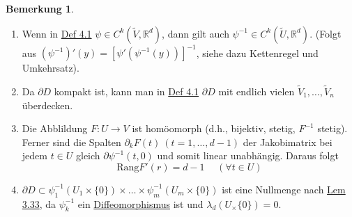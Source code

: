 \documentclass[a4paper]{scrreprt}
\newcommand{\R}{\mathbb{R}}
\newcommand{\jlabel}[1]{\label{j_#1}}
\newcommand{\jhyperref}[2]{\hyperref[j_#1]{#2}}
\newcommand{\jlink}[1]{\jhyperref{#1}{#1}}
\newcommand{\jabb}[3]{ #1: #2 \rightarrow #3 }
\theoremstyle{plain}
\theoremstyle{definition}
\newtheorem{bem}[thm]{Bemerkung}
\begin{document}
{{{{\jlabel{Bem 4.2}
\begin{bem}
    \begin{enumerate}
        \item Wenn in \jlink{Def 4.1} $\psi \in C^k(\tilde{V}, \R^d)$, dann gilt auch $\psi^{-1} \in C^k(\tilde{U}, \R^d)$. (Folgt aus $(\psi^{-1})'(y) = [\psi'(\psi^{-1}(y))]^{-1}$, siehe dazu Kettenregel und Umkehrsatz).
        \item Da $\partial D$ kompakt ist, kann man in \jlink{Def 4.1} $\partial D$ mit endlich vielen $\tilde{V}_1,\dots,\tilde{V}_n$ überdecken.
        \item Die Abblildung $\jabb{F}{U}{V}$ ist homöomorph (d.h., bijektiv, stetig, $F^{-1}$ stetig). Ferner sind die Spalten $\partial_kF(t) \ (t=1,\dots,d-1)$ der Jakobimatrix bei jedem $t\in U$ gleich $\partial \psi^{-1}(t,0)$ und somit linear unabhängig. Daraus folgt
        \begin{equation}
            \jlabel{(4.1)}
            \mathrm{Rang } F'(r) = d-1 \hspace{15pt} (\forall t\in U)
        \end{equation}
        \item $\partial D \subset \psi_1^{-1}(U_1 \times \{0\})\times \dots \times \psi_m^{-1}(U_m \times \{0\})$ ist eine Nullmenge nach \jlink{Lem 3.33}, da $\psi_k^{-1}$ ein \jlink{Diffeomorphismus} ist und $\lambda_d(U_ \times \{0\}) = 0$.
    \end{enumerate}
\end{bem}


}}}}
\end{document}
